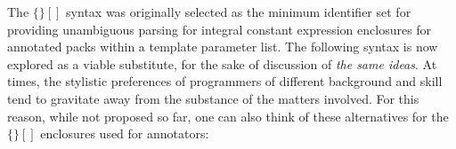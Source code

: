 {}

\p The $\bm{\{\}[]}$ syntax was originally selected as the minimum identifier set for providing unambiguous parsing for integral constant expression enclosures for annotated packs within a template parameter list.
The following syntax is now explored as a viable substitute, for the sake of discussion of \textit{the same ideas}. At times, the stylistic preferences of programmers of different background and skill tend to gravitate away from the substance of the matters involved.
For this reason, while not proposed so far, one can also think of these alternatives for the $\bm{\{\}[]}$ enclosures used for annotators:
